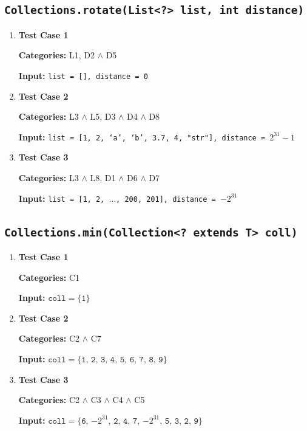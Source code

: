 \documentclass[12pt, a4paper]{article}
\begin{document}
\subsection{\texttt{Collections.rotate(List<?> list, int distance)}}
\begin{enumerate}
  \item \textbf{Test Case 1}
  \par\quad\textbf{Categories:} L1, D2 $\wedge$ D5
  \par\quad\textbf{Input:} \texttt{list = [], distance = 0}

  \item \textbf{Test Case 2}
  \par\quad\textbf{Categories:} L3 $\wedge$ L5, D3 $\wedge$ D4 $\wedge$ D8
  \par\quad\textbf{Input:} \texttt{list = [1, 2, `a', `b', 3.7, 4, "str"], distance = $2^{31} - 1$}

  \item \textbf{Test Case 3}
  \par\quad\textbf{Categories:} L3 $\wedge$ L8, D1 $\wedge$ D6 $\wedge$ D7
  \par\quad\textbf{Input:} \texttt{list = [1, 2, $\dots$, 200, 201], distance = $-2^{31}$}
\end{enumerate}

\subsection{\texttt{Collections.min(Collection<? extends T> coll)}}
\begin{enumerate}
  \item \textbf{Test Case 1}
  \par\quad\textbf{Categories:} C1
  \par\quad\textbf{Input:} $\texttt{coll} = \{\texttt{1}\}$

  \item \textbf{Test Case 2}
  \par\quad\textbf{Categories:} C2 $\wedge$ C7
  \par\quad\textbf{Input:} $\texttt{coll} = \{\texttt{1, 2, 3, 4, 5, 6, 7, 8, 9}\}$

  \item \textbf{Test Case 3}
  \par\quad\textbf{Categories:} C2 $\wedge$ C3 $\wedge$ C4 $\wedge$ C5

  \par\quad\textbf{Input:} $\texttt{coll} = \{\texttt{6, $-2^{31}$, 2, 4, 7, $-2^{31}$, 5, 3, 2,
  9}\}$
\end{enumerate}
\end{document}
